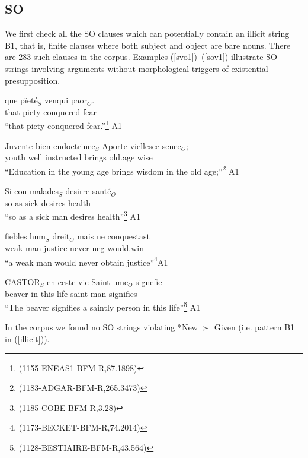\documentclass[output=paper,modfonts,nonflat]{langsci/langscibook}
\begin{document}
\subsection{SO}

We first check all the SO clauses which can potentially contain an illicit string B1, that is, finite clauses where both subject and object are bare nouns. There are 283 such clauses in the corpus. Examples (\ref{svo1})--(\ref{sov1}) illustrate SO strings involving arguments without morphological triggers of existential presupposition.%

\ea 
\gll que p\"{i}et\'{e}$_{S}$ venqui paor$_{O}$.\\
that piety conquered fear\\
\glt ``that piety conquered fear.''\footnote{\scriptsize{(1155-ENEAS1-BFM-R,87.1898)}}\label{svo1} \hfill A1
\z

\ea
\gll Juvente bien endoctrinee$_{S}$ Aporte viellesce senee$_{O}$;\\
youth well instructed brings old.age wise\\
\glt ``Education in the young age brings wisdom in the old age;''\footnote{\scriptsize{(1183-ADGAR-BFM-R,265.3473)}}\label{svo2} \hfill A1
\z

\ea
\gll Si con malades$_{S}$ desirre sant\'{e}$_{O}$ \\ %
so as sick desires health\\
\glt ``so as a sick man desires health''\footnote{\scriptsize{(1185-COBE-BFM-R,3.28)}}\label{svo3} \hfill A1
\z 

\ea
\gll fiebles hum$_{S}$ dreit$_{O}$ mais ne conquestast\\
weak man justice never {\sc neg} would.win\\
\glt ``a weak man would never obtain justice''\footnote{\scriptsize{(1173-BECKET-BFM-R,74.2014)}}\hfill A1
\z

\ea
\gll CASTOR$_{S}$ en ceste vie Saint ume$_{O}$ signefie\\
beaver in this life saint man signifies\\
\glt ``The beaver signifies a saintly person in this life''\footnote{\scriptsize{(1128-BESTIAIRE-BFM-R,43.564)}} \label{sov1} \hfill A1
\z

In the corpus we found no SO strings violating *New $\succ$ Given (i.e. pattern B1 in (\ref{illicit})).
\end{document}
